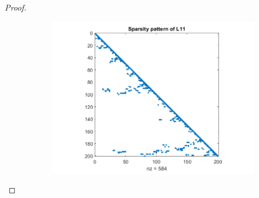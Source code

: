 \documentclass[12pt]{report}
\begin{document}
\begin{problem}
\begin{proof}
\begin{figure}[H]
\begin{subfigure}[b]{0.5\linewidth}
    \caption{}
    \label{fig:c}
    \vspace{4ex}
  \end{subfigure}%
  \begin{subfigure}[b]{0.5\linewidth}
    \centering
    \includegraphics[width=\linewidth]{L11.png}
    \caption{}
    \label{fig:d}
    \vspace{4ex}
  \end{subfigure}
  \caption{}
  \label{fig}
\end{figure}



\end{proof}
\end{problem}
\end{document}
